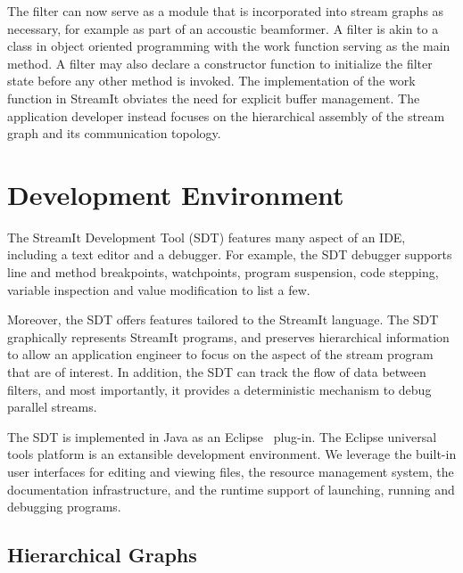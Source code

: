\documentclass[11pt, letterpaper, onecolumn]{article}
\begin{document}
The filter can now serve as  a module that is incorporated into stream
graphs as necessary, for example as part of an accoustic beamformer. A
filter is akin to a class in object oriented programming with the work
function  serving as  the main  method. A  filter may  also  declare a
constructor function  to initialize the filter state  before any other
method is invoked. The implementation of the work function in StreamIt
obviates  the need  for  explicit buffer  management. The  application
developer instead focuses on the  hierarchical assembly of  the stream
graph and its communication topology.


\section{Development Environment}

The StreamIt  Development Tool (SDT)  features many aspect of  an IDE,
including a text editor and  a debugger. For example, the SDT debugger
supports line and method breakpoints, watchpoints, program suspension,
code stepping,  variable inspection and  value modification to  list a
few.

Moreover,   the  SDT   offers  features   tailored  to   the  StreamIt
language.  The  SDT  graphically  represents  StreamIt  programs,  and
preserves hierarchical information to allow an application engineer to
focus on  the aspect of  the stream program  that are of  interest. In
addition, the SDT can track the flow of data between filters, and most
importantly, it  provides a deterministic mechanism  to debug parallel
streams.

The SDT  is implemented in Java as  an Eclipse~\cite{eclispe} plug-in.
The  Eclipse universal  tools  platform is  an extansible  development
environment. We leverage the built-in user interfaces for editing and
viewing  files,  the  resource  management system,  the  documentation
infrastructure,  and the  runtime  support of  launching, running  and
debugging programs.



\subsection{Hierarchical Graphs}
\end{document}
